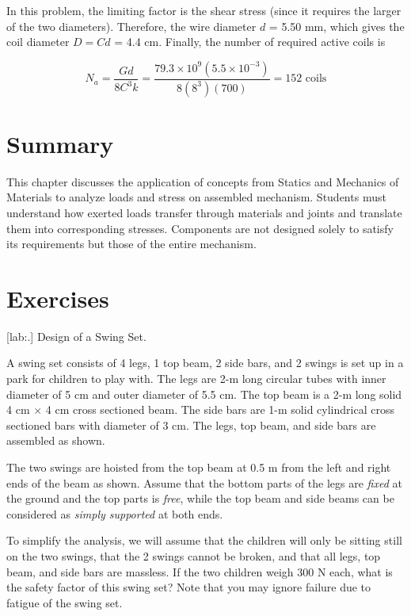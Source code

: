 \documentclass[a4paper,openany,12pt]{book}
\begin{document}
{{\begin{enumerate}
In this problem, the limiting factor is the shear stress (since it
requires the larger of the two diameters). Therefore, the wire diameter
\(d\) = 5.50 mm, which gives the coil diameter \(D = Cd\) = 4.4 cm. Finally,
the number of required active coils is

$$N_a = \frac{Gd}{8C^3k} = \frac{79.3 \times 10^9(5.5 \times 10^{-3})}{8(8^3)(700)} = 152\text{ coils}$$
\end{enumerate}

\section{Summary}
\label{summary-8}
This chapter discusses the application of concepts from Statics and
Mechanics of Materials to analyze loads and stress on assembled
mechanism. Students must understand how exerted loads transfer through
materials and joints and translate them into corresponding stresses.
Components are not designed solely to satisfy its requirements but those
of the entire mechanism.

\section{Exercises}
\label{exercises-8}
[lab:.] Design of a Swing Set.

A swing set consists of 4 legs, 1 top beam, 2 side bars, and 2 swings is
set up in a park for children to play with. The legs are 2-m long
circular tubes with inner diameter of 5 cm and outer diameter of 5.5 cm.
The top beam is a 2-m long solid 4 cm \(\times\) 4 cm cross sectioned
beam. The side bars are 1-m solid cylindrical cross sectioned bars with
diameter of 3 cm. The legs, top beam, and side bars are assembled as
shown.

The two swings are hoisted from the top beam at 0.5 m from the left and
right ends of the beam as shown. Assume that the bottom parts of the
legs are \emph{fixed} at the ground and the top parts is \emph{free}, while the
top beam and side beams can be considered as \emph{simply supported} at both
ends.

To simplify the analysis, we will assume that the children will only be
sitting still on the two swings, that the 2 swings cannot be broken, and
that all legs, top beam, and side bars are massless. If the two children
weigh 300 N each, what is the safety factor of this swing set? Note that
you may ignore failure due to fatigue of the swing set.

}}
\end{document}

